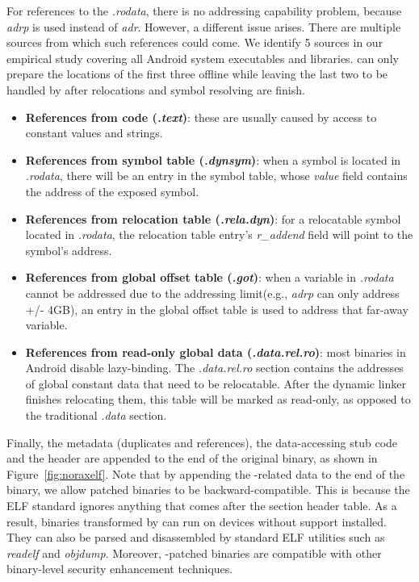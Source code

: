 For references to the \textit{.rodata}, there is no addressing capability problem, because \textit{adrp} is used instead of \textit{adr}. However, a different issue arises. There are multiple sources from which such references could come. We identify 5 sources in our empirical study covering all Android system executables and libraries. \NPatcher can only prepare the locations of the first three offline while leaving the last two to be handled by \NLoader after relocations and symbol resolving are finish. 
\begin{itemize}
	\item \textbf{References from code (\textit{.text})}: 
these are usually caused by access to constant values and strings. 
	\item \textbf{References from symbol table (\textit{.dynsym})}: 
when a symbol is located in \textit{.rodata}, there will be an entry in the symbol table, whose \textit{value} field contains the address of the exposed symbol. 
	\item \textbf{References from relocation table (\textit{.rela.dyn})}:
for a relocatable  symbol located in \textit{.rodata}, the relocation table entry's \textit{r\_addend} field will point to the symbol's address. 
	\item \textbf{References from global offset table (\textit{.got})}:
when a variable in \textit{.rodata} cannot be addressed due to the addressing limit(e.g., \textit{adrp} can only address +/- 4GB), an entry in the global offset table is used to address that far-away variable. 
	\item \textbf{References from read-only global data (\textit{.data.rel.ro})}: 
most binaries in Android disable lazy-binding. The \textit{.data.rel.ro} section contains the addresses of global constant data that need to be relocatable. After the dynamic linker finishes relocating them, this table will be marked as read-only, as opposed to the traditional \textit{.data} section.
\end{itemize}

Finally, the metadata (duplicates and references), the data-accessing stub code and the \NORAX header
are appended to the end of the original binary, as shown in Figure~\ref{fig:noraxelf}. Note that by appending the \NORAX-related data to the end of the binary, we allow patched binaries to be backward-compatible. This is because the ELF standard ignores anything that comes after the section header table. As a result, binaries transformed by \NPatcher can run on devices without \NORAX support installed. They can also be parsed and disassembled by standard ELF utilities such as \emph{readelf} and \emph{objdump}. Moreover, \NORAX-patched binaries are compatible with other binary-level security enhancement techniques.   



